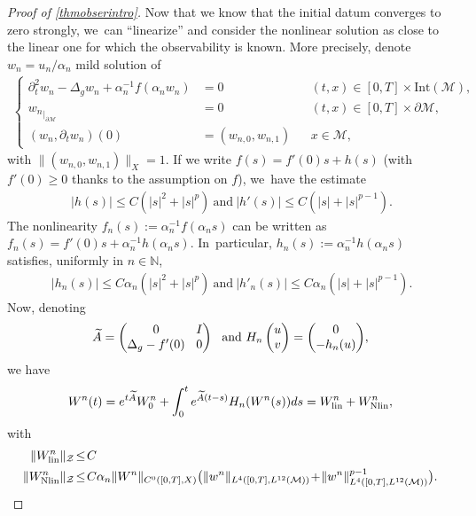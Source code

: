 \documentclass[10pt]{amsart}
\newcommand{\lin}{\textup{lin}}
\newcommand{\Nlin}{\textup{Nlin}}
\theoremstyle{definition}
\let\mc\mathcal
\newcommand{\M}{\mc{M}}
\newcommand{\N}{\mathbb{N}}
\providecommand{\norm}[1]{\lVert#1\rVert}
\begin{document}
\begin{proof}[Proof of \cref{thmobserintro}]
Now that we know that the initial datum converges to zero strongly, we~can ``linearize'' and consider the nonlinear solution as close to the linear one for which the observability is known. More precisely, denote $w_n=u_{n}/\alpha_n$ mild solution of
\begin{align*}
\left\{\begin{aligned}
\partial_t^2 w_n-\Delta_g w_n+\alpha_n^{-1}f(\alpha_n w_n)&=0 &&(t, x)\in [0, T]\times \text{Int}(\M),\\
{w_n}_{|_{\partial\M}}&=0 &&(t, x)\in [0, T]\times\partial\M,\\
(w_n, \partial_t w_n)(0)&=(w_{n,0}, w_{n,1})&&x\in \M,
\end{aligned}\right.
\end{align*}
with $\norm{(w_{n,0}, w_{n,1})}_{X}=1$. If we write $f(s)=f'(0)s+h(s)$ (with $f'(0)\geq 0$ thanks to the assumption on $f$), we~have the estimate
\begin{align*}
\ |h(s)|\leq C(|s|^2+|s|^p)\ \text{and}\ |h'(s)|\leq C(|s|+|s|^{p-1}).
\end{align*}
The nonlinearity $f_n(s):=\alpha_n^{-1}f(\alpha_n s)$ can be written as $f_n(s)=f'(0)s+\alpha_n^{-1}h(\alpha_n s)$. In~particular, $h_n(s):=\alpha_n^{-1}h(\alpha_n s)$ satisfies, uniformly in $n \in \N$,
\begin{align*}
\ |h_n(s)|\leq C\alpha_n(|s|^2+|s|^p)\ \text{and}\ |h'_n(s)|\leq C\alpha_n(|s|+|s|^{p-1}).
\end{align*}
Now, denoting
\begin{align*}\arraycolsep4.5pt
\widetilde A=\begin{pmatrix}
0 & I \\
\Delta_g -f'(0)& 0
\end{pmatrix}\ \text{ and }
H_n\begin{pmatrix}
u \\
v
\end{pmatrix}=\begin{pmatrix}
0 \\
-h_n(u)
\end{pmatrix}\!,
\end{align*}
we have
\begin{align*}
W^n(t)=e^{t\widetilde A}W_0^n+\int_0^t e^{\widetilde A(t-s)}H_n(W^n(s))ds=W_{\lin}^n+W_{\Nlin}^n,
\end{align*}
with
\begin{align}
\norm{W_{\lin}^n}_{\mc{Z}}&\!\leq\! C\\
\label{estimWNlin}\norm{W_{\Nlin}^n}_{\mc{Z}}&\!\leq\! C\alpha_n \norm{W^n}_{C^0([0, T],X)}\big(\norm{w^n}_{L^{4}([0, T],L^{12}(\M))}\!+\!\norm{w^n}_{L^{4}([0, T],L^{12}(\M))}^{p-1}\big).

\end{align}
\end{proof}
\end{document}
